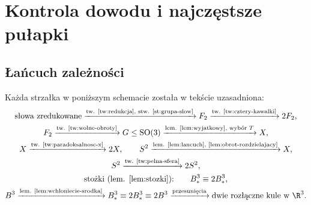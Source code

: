 \section{Kontrola dowodu i najczęstsze pułapki}
\subsection{Łańcuch zależności}
Każda strzałka w poniższym schemacie została w tekście uzasadniona:
\[
\begin{gathered}
\text{słowa zredukowane}\xrightarrow{\text{tw. \ref{tw:redukcja}, stw. \ref{st:grupa-slow}}}F_2
\xrightarrow{\text{tw. \ref{tw:cztery-kawalki}}}2F_2,\\
F_2\xrightarrow{\text{tw. \ref{tw:wolne-obroty}}}G\le\mathrm{SO}(3)
\xrightarrow{\text{lem. \ref{lem:wyjatkowy}, wybór }T}X,\\
X\xrightarrow{\text{tw. \ref{tw:paradoksalnosc-x}}}2X,
\qquad S^2\xrightarrow{\text{lem. \ref{lem:lancuch}, \ref{lem:obrot-rozdzielajacy}}}X,\\
S^2\xrightarrow{\text{tw. \ref{tw:pelna-sfera}}}2S^2,\\
\text{stożki (lem. \ref{lem:stozki}):}\qquad B^3_*\equiv2B^3_*,\\
B^3\xrightarrow{\text{lem. \ref{lem:wchloniecie-srodka}}}B^3_*
\equiv2B^3_*\equiv2B^3
\xrightarrow{\text{przesunięcia}}\text{dwie rozłączne kule w }\R^3.
\end{gathered}
\]
